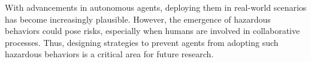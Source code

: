 With advancements in autonomous agents, deploying them in real-world scenarios has become increasingly plausible. However, the emergence of hazardous behaviors could pose risks, especially when humans are involved in collaborative processes. Thus, designing strategies to prevent agents from adopting such hazardous behaviors is a critical area for future research.

